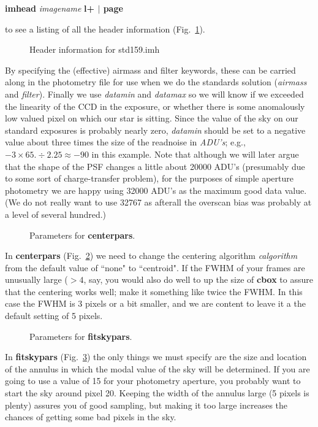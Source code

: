 \centerline{{\bf imhead} {\it imagename} {\bf l+ $|$ page}}
 
\noindent
to see a
listing of all the header information (Fig.~\ref{phothead}).
\begin{figure}
\vspace{4.0in}
\caption{\label{phothead} Header information for std159.imh}
\end{figure}
By specifying the (effective) airmass and filter keywords,
these can be carried along in the photometry file for use when we do
the standards solution ({\it airmass} and {\it filter}).  Finally we use
{\it datamin} and {\it datamax} so we will know if we exceeded the
linearity of the CCD in the exposure, or whether there is some anomalously
low valued pixel on which our star is sitting.
Since the value of the sky on our standard exposures is
probably nearly zero, {\it datamin} should be set to a negative value
about three times the size of the readnoise in {\it ADU's}; e.g., $-3 \times
65. \div 2.25 \approx -90$ in this example.  Note that although we will
later argue that the shape of the PSF changes a little about 20000 
ADU's (presumably due to some sort of charge-transfer problem),
for the purposes of simple aperture photometry we are happy
using 32000 ADU's as the maximum good data value. (We do not really
want to use 32767 as afterall the overscan bias was probably at a
level of several hundred.)
 
\begin{figure}
\vspace{3.0in}
\caption{\label{photcenterpars} Parameters for {\bf centerpars}.}
\end{figure}
In {\bf centerpars} (Fig.~\ref{photcenterpars}) we need to 
change the centering algorithm {\it calgorithm}
from the default value of ``none" to
``centroid".  If the FWHM of your frames are unusually large ($>4$, say,
you would also do well to up the size of {\bf cbox} to assure that the
centering works well; make it something like twice the FWHM. In this
case the FWHM is 3 pixels or a bit smaller, and we are content to leave
it a the default setting of 5 pixels.
 
\begin{figure}
\vspace{2.7in}
\caption{\label{photfitskypars} Parameters for {\bf fitskypars}.}
\end{figure}
In {\bf fitskypars} (Fig.~\ref{photfitskypars})
the only things we must specify are the size and
location of the annulus in which the modal value of the sky will be
determined.  If you are going to use a value of 15 for your photometry
aperture, you probably want to start the sky around pixel 20.  Keeping
the width of the 
annulus large (5 pixels is plenty) assures you of good sampling, but
making it too large increases the chances of getting some bad pixels in
the sky.
 
